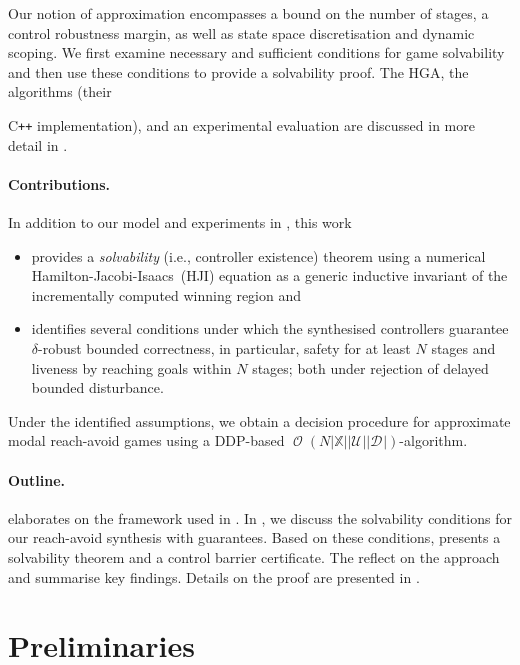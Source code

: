 \documentclass{article}
\newcommand\mkYcAoM[1][]{\mathcal{D}_{#1}}
\newcommand\mpBykPY[1][]{\mathcal{U}_{#1}}
\newcommand\mmHxeoG[1]{\operatorname{\mathcal{O}}(#1)}
\newcommand\majimMG[1]{|#1|}
\begin{document}
Our notion of approximation encompasses
a bound on the number of stages, 
a control robustness margin, 
as well as state space discretisation 
and dynamic scoping. 
We first examine necessary and sufficient conditions for game
solvability and then use these conditions to provide a solvability
proof.  The HGA, the algorithms (their {C\texttt{++} implementation), and
an experimental evaluation are discussed in more detail in
\cite{Gleirscher2025-ParametricModelOptimal}.

\paragraph{Contributions.}

In addition to our model and experiments in
\cite{Gleirscher2025-ParametricModelOptimal}, this work
\begin{itemize}
\item provides a \emph{solvability} (i.e., controller existence)
  theorem using a numerical Hamilton-Jacobi-Isaacs~(HJI) equation
  \cite{Tomlin2000-gametheoreticapproach} as a generic inductive
  invariant of the incrementally computed winning
  region 
  and
\item 
  identifies several conditions under which the synthesised 
  controllers guarantee $\delta$-robust bounded correctness, in
  particular, safety for at least $N$ stages and liveness by
  reaching goals within $N$ stages; both under rejection of
  delayed bounded disturbance.
\end{itemize}
Under the identified assumptions, we obtain a decision
procedure 
for approximate modal reach-avoid games using a DDP-based
$\mmHxeoG{N\majimMG{{\mathbb{X}}}\majimMG{\mpBykPY}\majimMG{\mkYcAoM}}$-algorithm.

\paragraph{Outline.}

 elaborates on the framework used in
\cite{Gleirscher2025-ParametricModelOptimal}.  In
, we discuss the solvability
conditions for our reach-avoid synthesis with guarantees.  Based on
these conditions,  presents a solvability
theorem and a control barrier certificate.  The
 reflect on the approach
and summarise key findings.  Details on the proof are presented in
.

\section{Preliminaries}
\label{l:2}

}
\end{document}
